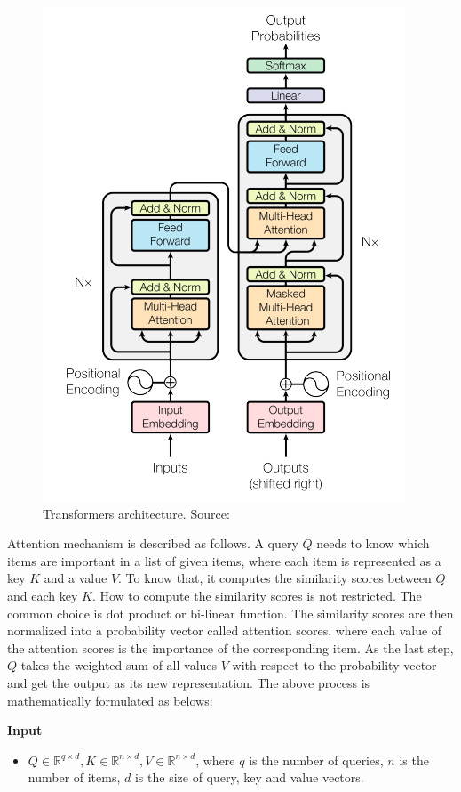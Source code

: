 \documentclass[3p, sort&compress, 12pt]{elsarticle}
\begin{document}
\begin{figure}[!htbp]
	\centering
	\includegraphics[scale=.7]{images/transformers.png}
	\caption{Transformers architecture. Source: \cite{vaswani2017attention}}
	\label{fig:2:04}
\end{figure}
\par Attention mechanism is described as follows. A query $Q$ needs to know which items are important in a list of given items, where each item is represented as a key $K$ and a value $V$. To know that, it computes the similarity scores between $Q$ and each key $K$. How to compute the similarity scores is not restricted. The common choice is dot product or bi-linear function. The similarity scores are then normalized into a probability vector called attention scores, where each value of the attention scores is the importance of the corresponding item. As the last step, $Q$ takes the weighted sum of all values $V$ with respect to the probability vector and get the output as its new representation. The above process is mathematically formulated as belows:
\par \textbf{Input}
\begin{itemize}
	\item $Q \in \mathbb{R}^{q \times d}, K \in \mathbb{R}^{n \times d}, V \in \mathbb{R}^{n \times d}$, where $q$ is the number of queries, $n$ is the number of items, $d$ is the size of query, key and value vectors.
\end{itemize}
\end{document}
